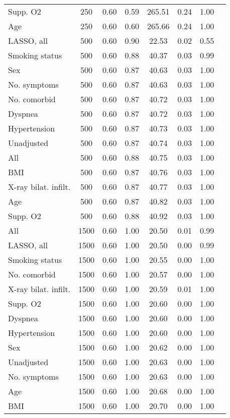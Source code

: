\documentclass{article}
\begin{document}
{\begin{longtable}{lccccccc}
Supp. O2 & 250 & 0.60 & 0.59 & 265.51 & 0.24 & 1.00 \\ 
Age & 250 & 0.60 & 0.60 & 265.66 & 0.24 & 1.00 \\ \midrule 
LASSO, all & 500 & 0.60 & 0.90 &  22.53 & 0.02 & 0.55 \\ 
Smoking status & 500 & 0.60 & 0.88 &  40.37 & 0.03 & 0.99 \\ 
Sex & 500 & 0.60 & 0.87 &  40.63 & 0.03 & 1.00 \\ 
No. symptoms & 500 & 0.60 & 0.87 &  40.63 & 0.03 & 1.00 \\ 
No. comorbid & 500 & 0.60 & 0.87 &  40.72 & 0.03 & 1.00 \\ 
Dyspnea & 500 & 0.60 & 0.87 &  40.72 & 0.03 & 1.00 \\ 
Hypertension & 500 & 0.60 & 0.87 &  40.73 & 0.03 & 1.00 \\ 
Unadjusted & 500 & 0.60 & 0.87 &  40.74 & 0.03 & 1.00 \\ 
All & 500 & 0.60 & 0.88 &  40.75 & 0.03 & 1.00 \\ 
BMI & 500 & 0.60 & 0.87 &  40.76 & 0.03 & 1.00 \\ 
X-ray bilat. infilt. & 500 & 0.60 & 0.87 &  40.77 & 0.03 & 1.00 \\ 
Age & 500 & 0.60 & 0.87 &  40.82 & 0.03 & 1.00 \\ 
Supp. O2 & 500 & 0.60 & 0.88 &  40.92 & 0.03 & 1.00 \\ \midrule 
All & 1500 & 0.60 & 1.00 &  20.50 & 0.01 & 0.99 \\ 
LASSO, all & 1500 & 0.60 & 1.00 &  20.50 & 0.00 & 0.99 \\ 
Smoking status & 1500 & 0.60 & 1.00 &  20.55 & 0.00 & 1.00 \\ 
No. comorbid & 1500 & 0.60 & 1.00 &  20.57 & 0.00 & 1.00 \\ 
X-ray bilat. infilt. & 1500 & 0.60 & 1.00 &  20.59 & 0.01 & 1.00 \\ 
Supp. O2 & 1500 & 0.60 & 1.00 &  20.60 & 0.00 & 1.00 \\ 
Dyspnea & 1500 & 0.60 & 1.00 &  20.60 & 0.00 & 1.00 \\ 
Hypertension & 1500 & 0.60 & 1.00 &  20.60 & 0.00 & 1.00 \\ 
Sex & 1500 & 0.60 & 1.00 &  20.62 & 0.00 & 1.00 \\ 
Unadjusted & 1500 & 0.60 & 1.00 &  20.63 & 0.00 & 1.00 \\ 
No. symptoms & 1500 & 0.60 & 1.00 &  20.63 & 0.00 & 1.00 \\ 
Age & 1500 & 0.60 & 1.00 &  20.68 & 0.00 & 1.00 \\ 
BMI & 1500 & 0.60 & 1.00 &  20.70 & 0.00 & 1.00 \\
\bottomrule
\hline
\end{longtable}
}
\end{document}
